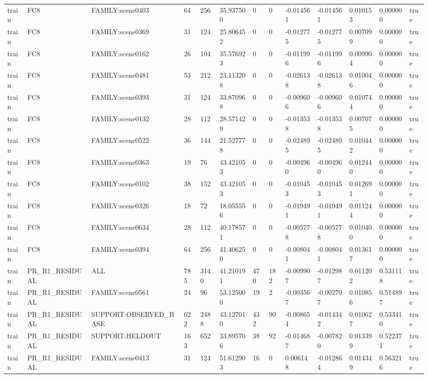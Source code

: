 \begin{tabular}{lllllllllllll}
train & FC8 & FAMILY:scene0403 & 64 & 256 & 35.937500 & 0 & 0 & -0.014561 & -0.014561 & 0.010153 & 0.000000 & true \\
train & FC8 & FAMILY:scene0369 & 31 & 124 & 25.806452 & 0 & 0 & -0.012775 & -0.012775 & 0.007099 & 0.000000 & true \\
train & FC8 & FAMILY:scene0162 & 26 & 104 & 35.576923 & 0 & 0 & -0.011996 & -0.011996 & 0.009904 & 0.000000 & true \\
train & FC8 & FAMILY:scene0481 & 53 & 212 & 23.113208 & 0 & 0 & -0.026138 & -0.026138 & 0.010046 & 0.000000 & true \\
train & FC8 & FAMILY:scene0393 & 31 & 124 & 33.870968 & 0 & 0 & -0.009606 & -0.009606 & 0.010744 & 0.000000 & true \\
train & FC8 & FAMILY:scene0132 & 28 & 112 & 28.571429 & 0 & 0 & -0.013538 & -0.013538 & 0.007075 & 0.000000 & true \\
train & FC8 & FAMILY:scene0522 & 36 & 144 & 21.527778 & 0 & 0 & -0.024895 & -0.024895 & 0.010442 & 0.000000 & true \\
train & FC8 & FAMILY:scene0363 & 19 & 76 & 43.421053 & 0 & 0 & -0.004960 & -0.004960 & 0.012440 & 0.000000 & true \\
train & FC8 & FAMILY:scene0102 & 38 & 152 & 43.421053 & 0 & 0 & -0.010453 & -0.010453 & 0.012691 & 0.000000 & true \\
train & FC8 & FAMILY:scene0326 & 18 & 72 & 18.055556 & 0 & 0 & -0.019491 & -0.019491 & 0.011244 & 0.000000 & true \\
train & FC8 & FAMILY:scene0634 & 28 & 112 & 40.178571 & 0 & 0 & -0.005778 & -0.005778 & 0.010400 & 0.000000 & true \\
train & FC8 & FAMILY:scene0394 & 64 & 256 & 41.406250 & 0 & 0 & -0.008041 & -0.008041 & 0.013617 & 0.000000 & true \\
train & PR\_R1\_RESIDUAL & ALL & 785 & 3140 & 41.210191 & 470 & 182 & -0.009907 & -0.012987 & 0.011202 & 0.531118 & true \\
train & PR\_R1\_RESIDUAL & FAMILY:scene0561 & 24 & 96 & 53.125000 & 19 & 2 & -0.003567 & -0.002707 & 0.010856 & 0.514897 & true \\
train & PR\_R1\_RESIDUAL & SUPPORT:OBSERVED\_BASE & 622 & 2488 & 43.127010 & 432 & 90 & -0.008654 & -0.014342 & 0.010627 & 0.533410 & true \\
train & PR\_R1\_RESIDUAL & SUPPORT:HELDOUT & 163 & 652 & 33.895706 & 38 & 92 & -0.014687 & -0.007820 & 0.013399 & 0.522371 & true \\
train & PR\_R1\_RESIDUAL & FAMILY:scene0413 & 31 & 124 & 51.612903 & 16 & 0 & 0.006148 & -0.012864 & 0.014349 & 0.563216 & true \\

\end{tabular}
